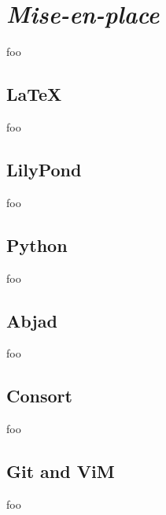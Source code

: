 \chapter{\emph{Mise-en-place}}

foo

\section{LaTeX}

foo

\section{LilyPond}

foo

\section{Python}

foo

\section{Abjad}

foo

\section{Consort}

foo

\section{Git and ViM}

foo
